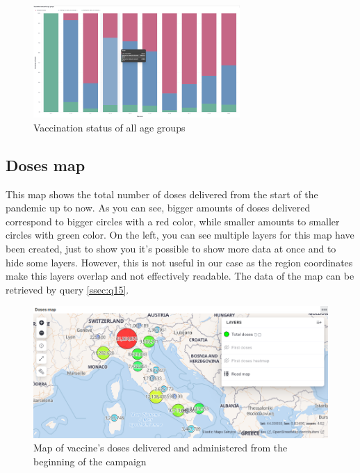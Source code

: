 \documentclass{article}[IEEEtran]
\begin{document}
\begin{figure}[H]
\begin{center}
    \includegraphics[width=0.7\textwidth, frame]{Vaccination status of all age groups.png}
    \caption{Vaccination status of all age groups}
\end{center}
\end{figure}

\subsection{Doses map}\label{ssec:dash7}

This map shows the total number of doses delivered from the start of the pandemic up to now. As you can see, bigger amounts of doses delivered correspond to bigger circles with a red color, while smaller amounts to smaller circles with green color. On the left, you can see multiple layers for this map have been created, just to show you it's possible to show more data at once and to hide some layers. However, this is not useful in our case as the region coordinates make this layers overlap and not effectively readable. The data of the map can be retrieved by query \ref{ssec:q15}.

\begin{figure}[H]
\begin{center}
    \includegraphics[width=1\textwidth, frame]{Doses_map.PNG}
    \caption{Map of vaccine's doses delivered and administered from the beginning of the campaign}
\end{center}
\end{figure}
\end{document}
